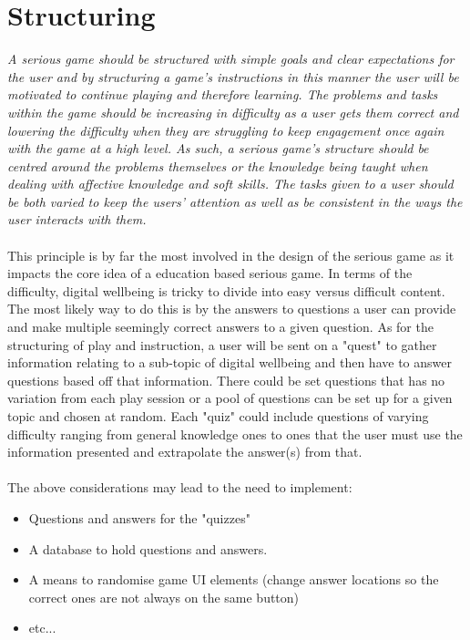 \documentclass[a4paper]{scrreprt}
\begin{document}
\section{Structuring}
\textit{A serious game should be structured with simple goals and clear expectations for the user and by structuring a game’s instructions in this manner the user will be motivated to continue playing and therefore learning. The problems and tasks within the game should be increasing in difficulty as a user gets them correct and lowering the difficulty when they are struggling to keep engagement once again with the game at a high level. As such, a serious game’s structure should be centred around the problems themselves or the knowledge being taught when dealing with affective knowledge and soft skills. The tasks given to a user should be both varied to keep the users' attention as well as be consistent in the ways the user interacts with them.}
\\\\
This principle is by far the most involved in the design of the serious game as it impacts the core idea of a education based serious game. In terms of the difficulty, digital wellbeing is tricky to divide into easy versus difficult content. The most likely way to do this is by the answers to questions a user can provide and make multiple seemingly correct answers to a given question. As for the structuring of play and instruction, a user will be sent on a "quest" to gather information relating to a sub-topic of digital wellbeing and then have to answer questions based off that information. There could be set questions that has no variation from each play session or a pool of questions can be set up for a given topic and chosen at random. Each "quiz" could include questions of varying difficulty ranging from general knowledge ones to ones that the user must use the information presented and extrapolate the answer(s) from that.
\\\\
The above considerations may lead to the need to implement:
\begin{itemize}
\item Questions and answers for the "quizzes"
\item A database to hold questions and answers.
\item A means to randomise game UI elements (change answer locations so the correct ones are not always on the same button)
\item etc...
\end{itemize}
\end{document}

